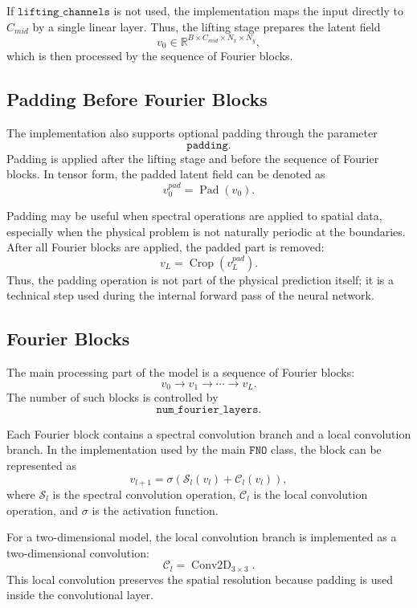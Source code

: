 \documentclass[14pt]{extarticle}
\begin{document}
If \(\texttt{lifting\_channels}\) is not used, the implementation maps the input directly to \(C_{mid}\) by a single linear layer. Thus, the lifting stage prepares the latent field
\[
v_0
\in
\mathbb{R}^{B \times C_{mid} \times N_x \times N_y},
\]
which is then processed by the sequence of Fourier blocks.

\subsection{Padding Before Fourier Blocks}

The implementation also supports optional padding through the parameter
\[
\texttt{padding}.
\]
Padding is applied after the lifting stage and before the sequence of Fourier blocks. In tensor form, the padded latent field can be denoted as
\[
v_0^{pad}
=
\operatorname{Pad}(v_0).
\]

Padding may be useful when spectral operations are applied to spatial data, especially when the physical problem is not naturally periodic at the boundaries. After all Fourier blocks are applied, the padded part is removed:
\[
v_L
=
\operatorname{Crop}(v_L^{pad}).
\]
Thus, the padding operation is not part of the physical prediction itself; it is a technical step used during the internal forward pass of the neural network.

\subsection{Fourier Blocks}

The main processing part of the model is a sequence of Fourier blocks:
\[
v_0
\rightarrow
v_1
\rightarrow
\cdots
\rightarrow
v_L.
\]
The number of such blocks is controlled by
\[
\texttt{num\_fourier\_layers}.
\]

Each Fourier block contains a spectral convolution branch and a local convolution branch. In the implementation used by the main \(\texttt{FNO}\) class, the block can be represented as
\[
v_{l+1}
=
\sigma
\left(
\mathcal{S}_l(v_l)
+
\mathcal{C}_l(v_l)
\right),
\]
where \(\mathcal{S}_l\) is the spectral convolution operation, \(\mathcal{C}_l\) is the local convolution operation, and \(\sigma\) is the activation function.

For a two-dimensional model, the local convolution branch is implemented as a two-dimensional convolution:
\[
\mathcal{C}_l
=
\operatorname{Conv2D}_{3 \times 3}.
\]
This local convolution preserves the spatial resolution because padding is used inside the convolutional layer.
\end{document}
